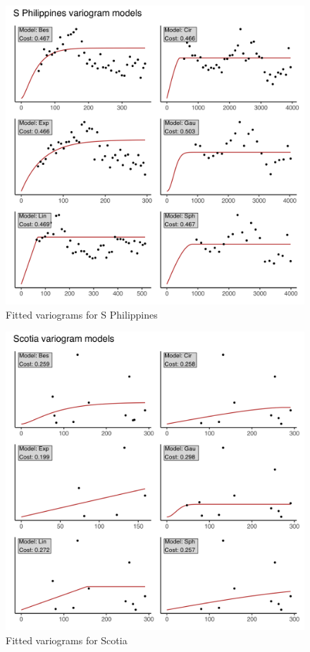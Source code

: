 \begin{figure}
\centering
\includegraphics{assets/figs/chpt3/SPhilippinesVgrms.png}
\caption[Fitted variograms for S Philippines]{Fitted variograms for S Philippines}
\end{figure}

\begin{figure}
\centering
\includegraphics{assets/figs/chpt3/ScotiaVgrms.png}
\caption[Fitted variograms for Scotia]{Fitted variograms for Scotia}
\end{figure}


